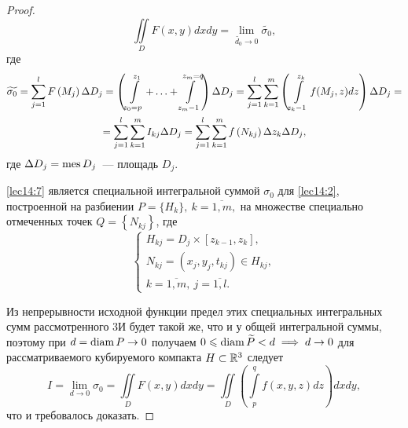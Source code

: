 \documentclass[../../main.tex]{subfiles}
\begin{document}
\begin{proof}
		\begin{equation}
		\iint\limits_D F\left(x, y\right) dxdy = \lim\limits_{\widetilde{d_0} 
		\to 0} \widetilde{\sigma_0}, \label{lec14:6}
		\end{equation}
		где 
		\begin{equation}
		\begin{gathered}
		\widetilde{\sigma_0} = \sum\limits_{j = 1}^{l} F\left(M_j\right) \Delta 
		D_j = \left(\int\limits_{z_0 = p}^{z_1} + \ldots + \int\limits_{z_m - 
		1}^{z_m = q} \right)\Delta D_j = \sum\limits_{j = 1}^{l} \sum\limits_{k = 1}^{m} 
		\left(\int\limits_{z_k - 1}^{z_k} f(M_j, z)dz\right) \Delta D_j = \\ 
		= \sum\limits_{j = 1}^{l} \sum\limits_{k = 1}^{m} I_{kj} \Delta D_j = 
		\sum\limits_{j = 1}^{l} \sum\limits_{k = 1}^{m} f\left(N_{kj}\right) \Delta 
		z_k \Delta D_j, \label{lec14:7}
		\end{gathered}
		\end{equation}
		где $\Delta D_j = \operatorname{mes} D_j$~--- площадь $D_j$.
		
		\eqref{lec14:7} является специальной интегральной суммой $\sigma_0$ для 
		\eqref{lec14:2}, построенной на разбиении $P = \{ H_k \},\ k = 
		\overline{1, m},$ на множестве специально отмеченных точек $Q = \left\{ 
		N_{kj}\right\}$, где 
		\[
		\begin{cases}
		H_{kj} = D_j \times \left[z_{k - 1}, z_k\right],\\
		N_{kj} = (x_j, y_j, t_{kj}) \in H_{kj}, \\
		k = \overline{1, m}, \ j = \overline{1, l}.
		\end{cases} 
		\]
		
		Из непрерывности исходной функции предел этих специальных интегральных сумм 
		рассмотренного 3И будет такой же, что и у общей интегральной суммы, поэтому 
		при $d = \operatorname{diam} P \to 0$ получаем $0 \leqslant \operatorname{diam} \widetilde{P} < d \implies d 
		\to 0$ для рассматриваемого кубируемого компакта $H \subset \mathbb{R}^3$ следует
		\begin{equation}
		I = \lim\limits_{d \to 0} \sigma_0 = \iint\limits_D  F\left(x, y\right) dxdy 
		= 
		\iint\limits_D \left(\int\limits_{p}^{q} f(x, y,z) dz\right) 
		dxdy, \label{lec14:9}
		\end{equation}
		что и требовалось доказать.
	\end{proof}
	
\end{document}
